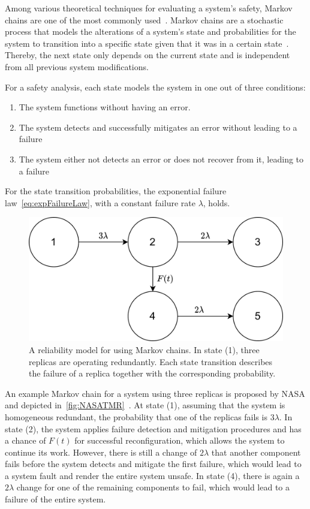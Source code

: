Among various theoretical techniques for evaluating a system's safety, Markov chains are one of the most commonly used~\cite{BarryFaultToleranceAnalysis}.
Markov chains are a stochastic process that models the alterations of a system's state and probabilities for the system to transition into a specific state given that it was in a certain state~\cite{KemenyMarkovChains}.
Thereby, the next state only depends on the current state and is independent from all previous system modifications.

For a safety analysis, each state models the system in one out of three conditions:
\begin{enumerate}
\item The system functions without having an error.
\item The system detects and successfully mitigates an error without leading to a failure
\item The system either not detects an error or does not recover from it, leading to a failure
\end{enumerate}

For the state transition probabilities, the exponential failure law~\autoref{eq:expFailureLaw}, with a constant failure rate $\lambda$, holds.

\begin{figure}[!hb]
	\centering
	\includegraphics[width=0.75\linewidth]{images/TriplexSystemNASA}
	\caption{A reliability model for  using Markov chains. In state (1), three replicas are operating redundantly. Each state transition describes the failure of a replica together with the corresponding probability.}
	\label{fig:NASATMR}
\end{figure}

An example Markov chain for a system using three replicas is proposed by NASA and depicted in~\autoref{fig:NASATMR}~\cite{NASAMarkovChains}.
At state (1), assuming that the system is homogeneous redundant, the probability that one of the replicas fails is $3\lambda$.
In state (2), the system applies failure detection and mitigation procedures and has a chance of $F(t)$ for successful reconfiguration, which allows the system to continue its work.
However, there is still a change of $2\lambda$ that another component fails before the system detects and mitigate the first failure, which would lead to a system fault and render the entire system unsafe.
In state (4), there is again a $2\lambda$ change for one of the remaining components to fail, which would lead to a failure of the entire system.

